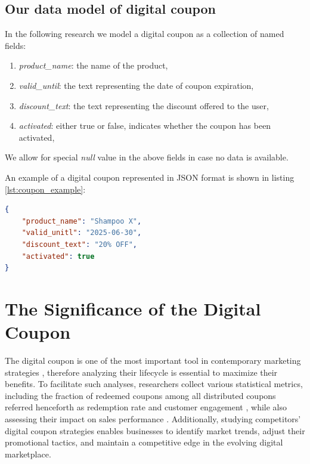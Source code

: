 \documentclass[licencjacka,en]{pracamgr}
\begin{document}
\subsection{Our data model of digital coupon}
\label{sec:coupon_model}
In the following research we model a digital coupon as a collection of named fields:
\begin{enumerate}
    \item \textit{product\_name}: the name of the product,
    \item \textit{valid\_until}: the text representing the date of coupon expiration,
    \item \textit{discount\_text}: the text representing the discount offered to the user,
    \item \textit{activated}: either true or false, indicates whether the coupon has been activated,
\end{enumerate}
We allow for special \textit{null} value in the above fields in case no data is available. 

An example of a digital coupon represented in JSON format is shown in listing \ref{lst:coupon_example}:

\begin{lstlisting}[language=json, caption={Example of a digital coupon in JSON format}, label={lst:coupon_example}]
{
    "product_name": "Shampoo X",
    "valid_unitl": "2025-06-30",
    "discount_text": "20% OFF",
    "activated": true
}
\end{lstlisting}

\section{The Significance of the Digital Coupon}
The digital coupon is one of the most important tool in contemporary marketing strategies \cite{targeted_reminders}, therefore analyzing their lifecycle is essential to maximize their benefits. To facilitate such analyses, researchers collect various statistical metrics, including the fraction of redeemed coupons among all distributed coupons referred henceforth as redemption rate \cite{danaher2015} and customer engagement \cite{jayadharshini2023}, while also assessing their impact on sales performance \cite{jayadharshini2023}.  Additionally, studying competitors' digital coupon strategies enables businesses to identify market trends, adjust their promotional tactics, and maintain a competitive edge in the evolving digital marketplace. 
\end{document}
